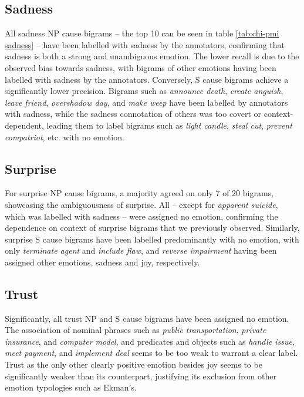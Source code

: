 \subsection{Sadness}

All sadness NP cause bigrams -- the top 10 can be seen in table \ref{tab:chi-pmi sadness} -- have been labelled with sadness by the annotators, confirming that sadness is both a strong and unambiguous emotion. The lower recall is due to the observed bias towards sadness, with bigrams of other emotions having been labelled with sadness by the annotators.
Conversely, S cause bigrams achieve a significantly lower precision. Bigrams such as \textit{announce death}, \textit{create anguish}, \textit{leave friend}, \textit{overshadow day}, and \textit{make weep} have been labelled by annotators with sadness, while the sadness connotation of others was too covert or context-dependent, leading them to label bigrams such as \textit{light candle}, \textit{steal cut}, \textit{prevent compatriot}, etc. with no emotion.

\subsection{Surprise}

For surprise NP cause bigrams, a majority agreed on only 7 of 20 bigrams, showcasing the ambiguousness of surprise. All -- except for \textit{apparent suicide}, which was labelled with sadness -- were assigned no emotion, confirming the dependence on context of surprise bigrams that we previously observed.
Similarly, surprise S cause bigrams have been labelled predominantly with no emotion, with only \textit{terminate agent} and \textit{include flaw}, and \textit{reverse impairment} having been assigned other emotions, sadness and joy, respectively.

\subsection{Trust}

Significantly, all trust NP and S cause bigrams have been assigned no emotion. The association of nominal phrases such as \textit{public transportation}, \textit{private insurance}, and \textit{computer model}, and predicates and objects such as \textit{handle issue}, \textit{meet payment}, and \textit{implement deal} seems to be too weak to warrant a clear label. Trust as the only other clearly positive emotion besides joy seems to be significantly weaker than its counterpart, justifying its exclusion from other emotion typologies such as Ekman's.

